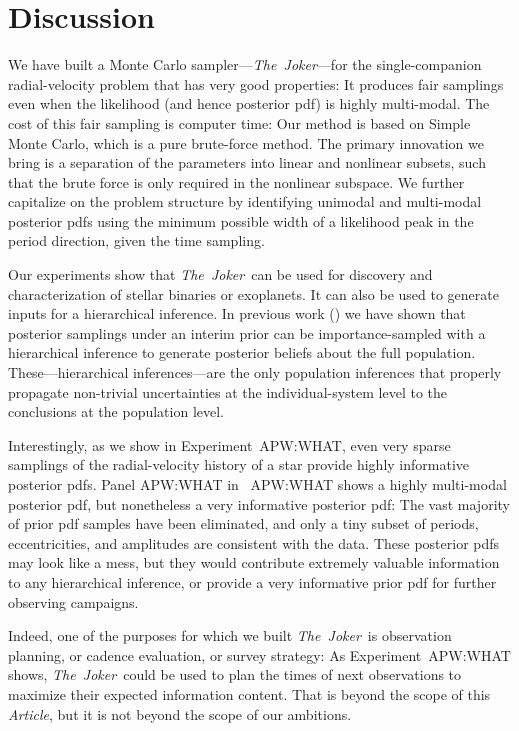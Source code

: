 \documentclass[manuscript, letterpaper]{aastex6}
\newcommand{\project}[1]{\textsl{#1}}
\newcommand{\samplername}{\project{The~Joker}}
\newcommand{\documentname}{\textsl{Article}}
\begin{document}
\section{Discussion} \label{sec:discussion}

We have built a Monte Carlo sampler---\samplername---for the
single-companion radial-velocity problem that has very good
properties:
It produces fair samplings even when the likelihood (and hence
posterior pdf) is highly multi-modal.
The cost of this fair sampling is computer time:
Our method is based on Simple Monte Carlo, which is a pure brute-force
method.
The primary innovation we bring is a separation of the parameters
into linear and nonlinear subsets, such that the brute force is only
required in the nonlinear subspace.
We further capitalize on the problem structure by identifying unimodal
and multi-modal posterior pdfs using the minimum possible width of a
likelihood peak in the period direction, given the time sampling.

Our experiments show that \samplername\ can be used for discovery and
characterization of stellar binaries or exoplanets.
It can also be used to generate inputs for a hierarchical inference.
In previous work (\citealt{hoggeccentricity, dfmexopop}) we have shown
that posterior samplings under an interim prior can be importance-sampled
with a hierarchical inference to generate posterior beliefs about the
full population.
These---hierarchical inferences---are the only population inferences
that properly propagate non-trivial uncertainties at the
individual-system level to the conclusions at the population level.

Interestingly, as we show in Experiment~APW:WHAT, even very sparse
samplings of the radial-velocity history of a star provide highly
informative posterior pdfs.
Panel APW:WHAT in \figurename~APW:WHAT shows a highly multi-modal
posterior pdf, but nonetheless a very informative posterior pdf:
The vast majority of prior pdf samples have been eliminated, and
only a tiny subset of periods, eccentricities, and amplitudes are
consistent with the data.
These posterior pdfs may look like a mess, but they would contribute
extremely valuable information to any hierarchical inference, or
provide a very informative prior pdf for further observing campaigns.

Indeed, one of the purposes for which we built \samplername\ is
observation planning, or cadence evaluation, or survey strategy:
As Experiment~APW:WHAT shows, \samplername\ could be used to plan the
times of next observations to maximize their expected information
content.
That is beyond the scope of this \documentname, but it is not beyond
the scope of our ambitions.
\end{document}
